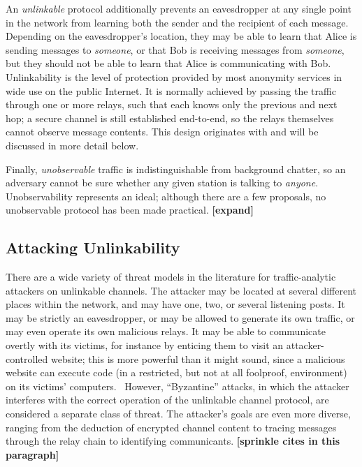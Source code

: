 \documentclass{zarticle}
\def\todo#1{{\color{todocolor}\bfseries [#1]}}
\begin{document}
An \emph{unlinkable} protocol additionally prevents an eavesdropper at
any single point in the network from learning both the sender and the
recipient of each message.  Depending on the eavesdropper's location,
they may be able to learn that Alice is sending messages to
\emph{someone}, or that Bob is receiving messages from \emph{someone},
but they should not be able to learn that Alice is communicating with
Bob.  Unlinkability is the level of protection provided by most
anonymity services in wide use on the public Internet.  It is normally
achieved by passing the traffic through one or more relays, such that
each knows only the previous and next hop; a secure channel is still
established end-to-end, so the relays themselves cannot observe
message contents.  This design originates with \textcite{chaum1981mix}
and will be discussed in more detail below.

Finally, \emph{unobservable} traffic is indistinguishable from
background chatter, so an adversary cannot be sure whether any given
station is talking to \emph{anyone}.  Unobservability represents an
ideal; although there are a few proposals, no unobservable protocol
has been made practical.  \todo{expand}

\subsection{Attacking Unlinkability}

There are a wide variety of threat models in the literature for
traffic-analytic attackers on unlinkable channels.  The attacker may
be located at several different places within the network, and may
have one, two, or several listening posts.  It may be strictly an
eavesdropper, or may be allowed to generate its own traffic, or may
even operate its own malicious relays.  It may be able to communicate
overtly with its victims, for instance by enticing them to visit an
attacker-controlled website; this is more powerful than it might
sound, since a malicious website can execute code (in a restricted,
but not at all foolproof, environment) on its victims'
computers.~\cite{barth2008securing} However, “Byzantine” attacks, in
which the attacker interferes with the correct operation of the
unlinkable channel protocol, are considered a separate class of
threat.  The attacker's goals are even more diverse, ranging from
the deduction of encrypted channel content to tracing messages through
the relay chain to identifying communicants. \todo{sprinkle cites in
  this paragraph}
\end{document}
